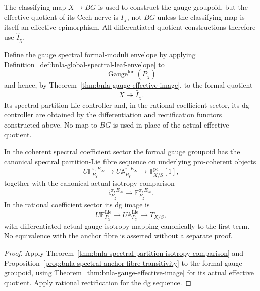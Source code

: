 \begin{remark}
The classifying map $X\to BG$ is used to construct the gauge groupoid, but the
effective quotient of its Cech nerve is $I_\chi$, not $BG$ unless the
classifying map is itself an effective epimorphism.  All differentiated
quotient constructions therefore use $\widehat I_\chi$.
\end{remark}

\begin{definition}
\label{def:bnla-gauge-formal-envelope}
Define the gauge spectral formal-moduli envelope by applying
Definition~\ref{def:bnla-global-spectral-leaf-envelope} to
\[
    \operatorname{Gauge}^{\mathrm{for}}(P_\chi)
\]
and hence, by Theorem~\ref{thm:bnla-gauge-effective-image}, to the formal
quotient
\[
    X\twoheadrightarrow\widehat I_\chi.
\]
Its spectral partition-Lie controller and, in the rational coefficient
sector, its dg controller are obtained by the differentiation and
rectification functors constructed above.  No map to $BG$ is used in place
of the actual effective quotient.
\end{definition}

\begin{proposition}
\label{prop:bnla-gauge-anchor-fibre}
In the coherent spectral coefficient sector the formal gauge groupoid has the
canonical spectral partition-Lie fibre sequence on underlying pro-coherent
objects
\[
\boxed{
    U\mathbb F^{\pi,E_\infty}_{P_\chi}
    \longrightarrow
    U\mathbb A^{\pi,E_\infty}_{P_\chi}
    \longrightarrow
    \mathbb T^{\mathrm{pc}}_{X/S}[1],}
\]
together with the canonical actual-isotropy comparison
\[
    \mathfrak i^{\pi,E_\infty}_{P_\chi}
    \longrightarrow
    \mathbb F^{\pi,E_\infty}_{P_\chi}.
\]
In the rational coefficient sector its dg image is
\[
    U\mathbb F^{\mathrm{Lie}}_{P_\chi}
    \longrightarrow
    U\mathbb A^{\mathrm{Lie}}_{P_\chi}
    \longrightarrow
    T_{X/S},
\]
with differentiated actual gauge isotropy mapping canonically to the first
term.  No equivalence with the anchor fibre is asserted without a separate
proof.
\end{proposition}

\begin{proof}
Apply
Theorem~\ref{thm:bnla-spectral-partition-isotropy-comparison} and
Proposition~\ref{prop:bnla-spectral-anchor-fibre-transitivity} to the formal
gauge groupoid, using
Theorem~\ref{thm:bnla-gauge-effective-image} for its actual effective
quotient.  Apply rational rectification for the dg sequence.
\end{proof}

